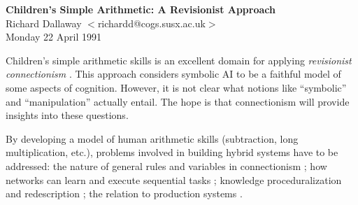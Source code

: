 \pagestyle{empty}


\begin{flushleft}
{\large\bf Children's Simple Arithmetic: A Revisionist
Approach}\medskip\\
\rm\small Richard Dallaway $<$richardd@cogs.susx.ac.uk$>$\\
Monday 22 April 1991
\end{flushleft}
\parindent=0pt\parskip=1mm

Children's simple arithmetic skills \cite*{mindbugs,mcclcogn} is
an excellent domain for applying {\em revisionist connectionism}
\cite*{tourbolt,hintmapp,ptc}.  This approach considers symbolic AI
to be a faithful model of some aspects of cognition.  However, it is not
clear what notions like ``symbolic'' and ``manipulation''
actually entail. The hope is that connectionism will provide
insights into these questions.

By developing a model of human arithmetic skills (subtraction, long
multiplication, etc.), problems involved in building hybrid systems
have to be addressed: the nature of general rules and variables in
connectionism \cite*{micro,kirswhen}; how networks can learn and execute
sequential tasks \cite*{elmafind}; knowledge proceduralization and
redescription \cite*{innards}; the relation to production systems
\cite*{andearch}.



